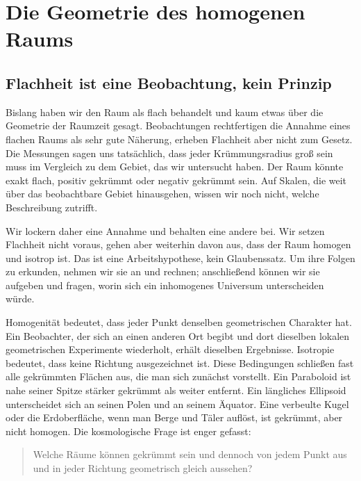 \chapter{Die Geometrie des homogenen Raums}


\section{Flachheit ist eine Beobachtung, kein Prinzip}

Bislang haben wir den Raum als flach behandelt und kaum etwas über die Geometrie der Raumzeit gesagt. Beobachtungen rechtfertigen die Annahme eines flachen Raums als sehr gute Näherung, erheben Flachheit aber nicht zum Gesetz. Die Messungen sagen uns tatsächlich, dass jeder Krümmungsradius groß sein muss im Vergleich zu dem Gebiet, das wir untersucht haben. Der Raum könnte exakt flach, positiv gekrümmt oder negativ gekrümmt sein. Auf Skalen, die weit über das beobachtbare Gebiet hinausgehen, wissen wir noch nicht, welche Beschreibung zutrifft.

Wir lockern daher eine Annahme und behalten eine andere bei. Wir setzen Flachheit nicht voraus, gehen aber weiterhin davon aus, dass der Raum homogen und isotrop ist. Das ist eine Arbeitshypothese, kein Glaubenssatz. Um ihre Folgen zu erkunden, nehmen wir sie an und rechnen; anschließend können wir sie aufgeben und fragen, worin sich ein inhomogenes Universum unterscheiden würde.

Homogenität bedeutet, dass jeder Punkt denselben geometrischen Charakter hat. Ein Beobachter, der sich an einen anderen Ort begibt und dort dieselben lokalen geometrischen Experimente wiederholt, erhält dieselben Ergebnisse. Isotropie bedeutet, dass keine Richtung ausgezeichnet ist. Diese Bedingungen schließen fast alle gekrümmten Flächen aus, die man sich zunächst vorstellt. Ein Paraboloid ist nahe seiner Spitze stärker gekrümmt als weiter entfernt. Ein längliches Ellipsoid unterscheidet sich an seinen Polen und an seinem Äquator. Eine verbeulte Kugel oder die Erdoberfläche, wenn man Berge und Täler auflöst, ist gekrümmt, aber nicht homogen. Die kosmologische Frage ist enger gefasst:
\begin{quote}Welche Räume können gekrümmt sein und dennoch von jedem Punkt aus und in jeder Richtung geometrisch gleich aussehen?
\end{quote}

